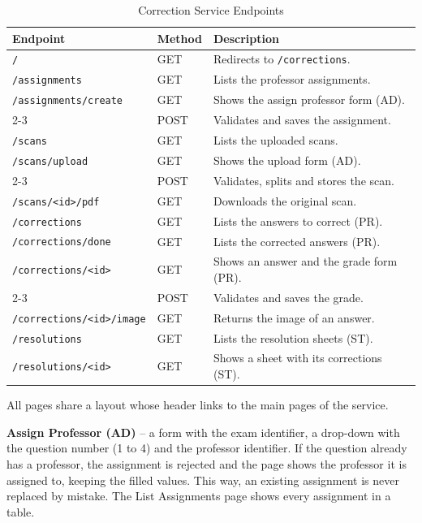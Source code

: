 \documentclass[letterpaper, 10 pt, conference]{ieeeconf}
\renewcommand{\_}{\textunderscore\allowbreak}
\begin{document}
\begin{table}[H]
    \centering
    \footnotesize
    \caption{Correction Service Endpoints}
    \label{tab:correction-endpoints}
    \begin{tabular}{|p{2.9cm}|p{0.8cm}|p{3.6cm}|}
        \hline
        \textbf{Endpoint} & \textbf{Method} & \textbf{Description} \\ \hline
        \texttt{/} & GET & Redirects to \texttt{/corrections}. \\ \hline
        \texttt{/assignments} & GET & Lists the professor assignments. \\ \hline
        \texttt{/assignments/}\allowbreak\texttt{create} & GET & Shows the assign professor form (AD\_4). \\ \cline{2-3}
         & POST & Validates and saves the assignment. \\ \hline
        \texttt{/scans} & GET & Lists the uploaded scans. \\ \hline
        \texttt{/scans/upload} & GET & Shows the upload form (AD\_5). \\ \cline{2-3}
         & POST & Validates, splits and stores the scan. \\ \hline
        \texttt{/scans/<id>/pdf} & GET & Downloads the original scan. \\ \hline
        \texttt{/corrections} & GET & Lists the answers to correct (PR\_1). \\ \hline
        \texttt{/corrections/done} & GET & Lists the corrected answers (PR\_3). \\ \hline
        \texttt{/corrections/<id>} & GET & Shows an answer and the grade form (PR\_2). \\ \cline{2-3}
         & POST & Validates and saves the grade. \\ \hline
        \texttt{/corrections/<id>}\allowbreak\texttt{/image} & GET & Returns the image of an answer. \\ \hline
        \texttt{/resolutions} & GET & Lists the resolution sheets (ST\_3). \\ \hline
        \texttt{/resolutions/<id>} & GET & Shows a sheet with its corrections (ST\_3). \\ \hline
    \end{tabular}
\end{table}

All pages share a layout whose header links to the main pages of the service.

\textbf{Assign Professor (AD\_4)} -- a form with the exam identifier, a drop-down with the question number (1 to 4) and the professor identifier. If the question already has a professor, the assignment is rejected and the page shows the professor it is assigned to, keeping the filled values. This way, an existing assignment is never replaced by mistake. The List Assignments page shows every assignment in a table.
\end{document}
